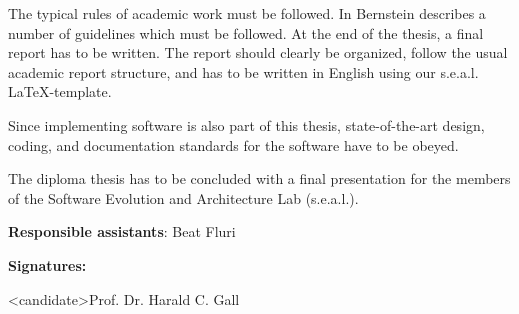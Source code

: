 \documentclass{task_description}
\begin{document}
The typical rules of academic work must be followed. In
\cite{Bernstein2005-daguide} Bernstein describes a number of guidelines which
must be followed. At the end of the thesis, a final report has to be
written. The report should clearly be organized, follow the usual academic
report structure, and has to be written in English using our
s.e.a.l. \LaTeX-template.

Since implementing software is also part of this thesis, state-of-the-art
design, coding, and documentation standards for the software have to be obeyed.

The diploma thesis has to be concluded with a final presentation for the members
of the Software Evolution and Architecture Lab (s.e.a.l.).

\vspace{2em}
\noindent\textbf{Responsible assistants}: Beat Fluri

\vspace{2em}
\noindent\textbf{Signatures:}

\vspace{3\baselineskip}
\noindent <candidate>\hfill Prof. Dr. Harald C. Gall
\clearpage


\end{document}
